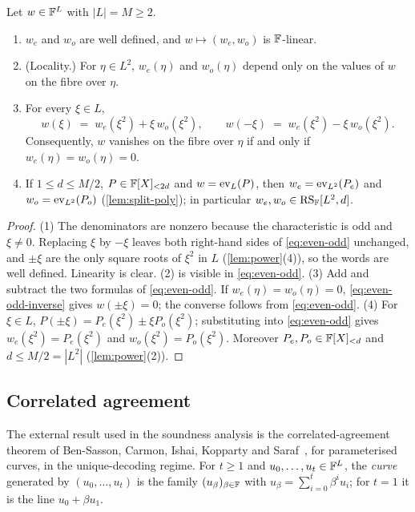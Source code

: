 \begin{lemma}\label{lem:split-words}
Let $w \in \mathbb{F}^L$ with $|L| = M \ge 2$.
\begin{enumerate}
  \item $w_e$ and $w_o$ are well defined, and $w \mapsto (w_e, w_o)$ is $\mathbb{F}$-linear.
  \item (Locality.) For $\eta \in L^2$, $w_e(\eta)$ and $w_o(\eta)$ depend only on the values of $w$ on the fibre over $\eta$.
  \item For every $\xi \in L$,
  \begin{equation}\label{eq:even-odd-inverse}
    w(\xi) \;=\; w_e(\xi^2) + \xi\, w_o(\xi^2), \qquad w(-\xi) \;=\; w_e(\xi^2) - \xi\, w_o(\xi^2).
  \end{equation}
  Consequently, $w$ vanishes on the fibre over $\eta$ if and only if $w_e(\eta) = w_o(\eta) = 0$.
  \item If $1 \le d \le M/2$, $P \in \mathbb{F}[X]_{<2d}$ and $w = \mathrm{ev}_L(P)$, then $w_e = \mathrm{ev}_{L^2}(P_e)$ and $w_o = \mathrm{ev}_{L^2}(P_o)$ (\cref{lem:split-poly}); in particular $w_e, w_o \in \mathrm{RS}_{\mathbb{F}}[L^2, d]$.
\end{enumerate}
\end{lemma}

\begin{proof}
(1) The denominators are nonzero because the characteristic is odd and $\xi \ne 0$. Replacing $\xi$ by $-\xi$ leaves both right-hand sides of \eqref{eq:even-odd} unchanged, and $\pm\xi$ are the only square roots of $\xi^2$ in $L$ (\cref{lem:power}(4)), so the words are well defined. Linearity is clear.
(2) is visible in \eqref{eq:even-odd}.
(3) Add and subtract the two formulas of \eqref{eq:even-odd}. If $w_e(\eta) = w_o(\eta) = 0$, \eqref{eq:even-odd-inverse} gives $w(\pm\xi) = 0$; the converse follows from \eqref{eq:even-odd}.
(4) For $\xi \in L$, $P(\pm\xi) = P_e(\xi^2) \pm \xi P_o(\xi^2)$; substituting into \eqref{eq:even-odd} gives $w_e(\xi^2) = P_e(\xi^2)$ and $w_o(\xi^2) = P_o(\xi^2)$. Moreover $P_e, P_o \in \mathbb{F}[X]_{<d}$ and $d \le M/2 = |L^2|$ (\cref{lem:power}(2)).
\end{proof}

\subsection{Correlated agreement}\label{sec:prelim:gaps}

The external result used in the soundness analysis is the correlated-agreement theorem of Ben-Sasson, Carmon, Ishai, Kopparty and Saraf~\cite{BCIKS23}, for parameterised curves, in the unique-decoding regime.
For $t \ge 1$ and $u_0, \dots, u_t \in \mathbb{F}^L$, the \emph{curve} generated by $(u_0,\dots,u_t)$ is the family $(u_\beta)_{\beta \in \mathbb{F}}$ with $u_\beta = \sum_{i=0}^{t} \beta^i u_i$; for $t = 1$ it is the line $u_0 + \beta u_1$.

